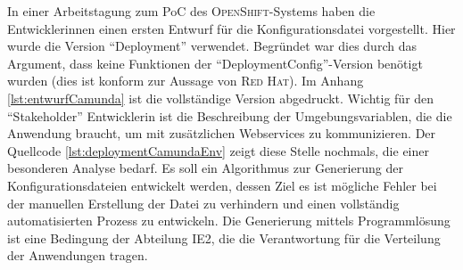 In einer Arbeitstagung zum \ac{PoC} des \textsc{OpenShift}-Systems haben die Entwicklerinnen einen ersten Entwurf für die Konfigurationsdatei vorgestellt. Hier wurde die Version \enquote{Deployment} verwendet. Begründet war dies durch das Argument, dass keine Funktionen der \enquote{DeploymentConfig}-Version benötigt wurden (dies ist konform zur Aussage von \textsc{Red Hat}\autocite[vgl.][Application\,$\rightarrow$\,Deployments]{red_hat_inc_okd_2019}). Im Anhang \vref{lst:entwurfCamunda} ist die vollständige Version abgedruckt. Wichtig für den \enquote{Stakeholder} Entwicklerin ist die Beschreibung der Umgebungsvariablen, die die Anwendung braucht, um mit zusätzlichen Webservices zu kommunizieren. Der Quellcode \vref{lst:deploymentCamundaEnv} zeigt diese Stelle nochmals, die einer besonderen Analyse bedarf. Es soll ein Algorithmus zur Generierung der Konfigurationsdateien entwickelt werden, dessen Ziel es ist mögliche Fehler bei der manuellen Erstellung der Datei zu verhindern und einen vollständig automatisierten Prozess zu entwickeln. Die Generierung mittels Programmlösung ist eine Bedingung der Abteilung \ac{IE2}, die die Verantwortung für die Verteilung der Anwendungen tragen.

 

